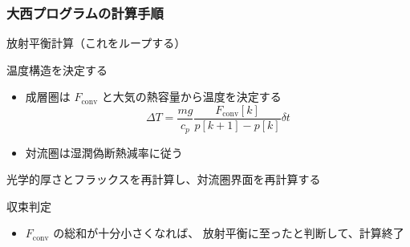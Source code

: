 \documentclass[aspectratio=149,9pt]{beamer}
\newcommand{\hmfconv}{F_\mathrm{conv}}
\begin{document}
\begin{frame}
	\frametitle{大西プログラムの計算手順}
	\begin{enu}[resume*=pros]
		\item 放射平衡計算（これをループする）
			\begin{enu}[series=rad]
				\item 温度構造を決定する
					\begin{itemize}
						\item 成層圏は \(\hmfconv\) と大気の熱容量から温度を決定する
							\begin{equation}
								\Delta T=\frac{mg}{c_p}\frac{\hmfconv[k]}{p[k+1]-p[k]}\delta t
							\end{equation}
						\item 対流圏は湿潤偽断熱減率に従う
					\end{itemize}
				\item 光学的厚さとフラックスを再計算し、対流圏界面を再計算する
				\item 収束判定
					\begin{itemize}
						\item \(\hmfconv\) の総和が十分小さくなれば、
							放射平衡に至ったと判断して、計算終了
					\end{itemize}
			\end{enu}
	\end{enu}
\end{frame}
\end{document}
